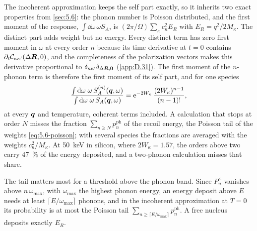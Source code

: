 The incoherent approximation keeps the self part exactly, so it inherits two exact properties from \cref{sec:5.6}: the phonon number is Poisson distributed, and the first moment of the response, $\int\dd\omega\,\omega S_A$, is $(2\pi/\Omega)\sum_\kappa c_\kappa^2E_R$ with $E_R = q^2/2M_\kappa$. The distinct part adds weight but no energy. Every distinct term has zero first moment in $\omega$ at every order $n$ because its time derivative at $t = 0$ contains $\partial_t\mathcal{C}_{\kappa\kappa'}(\Delta\bm{R},0)$, and the completeness of the polarization vectors makes this derivative proportional to $\delta_{\kappa\kappa'}\delta_{\Delta\bm{R},\bm{0}}$ (\cref{app:D.31}). The first moment of the $n$-phonon term is therefore the first moment of its self part, and for one species
\begin{equation}
  \frac{\int\mathrm{d}\omega\;\omega\,S^{(n)}_A(\bm{q},\omega)}{\int\mathrm{d}\omega\;\omega\,S_A(\bm{q},\omega)} = \mathrm{e}^{-2W_\kappa}\,\frac{(2W_\kappa)^{n-1}}{(n-1)!} ,
  \label{eq:11.3-fsum}
\end{equation}
at every $\bm{q}$ and temperature, coherent terms included. A calculation that stops at order $N$ misses the fraction $\sum_{n \ge N}p^{\mathrm{ph}}_n$ of the recoil energy, the Poisson tail of the weights \cref{eq:5.6-poisson}; with several species the fractions are averaged with the weights $c_\kappa^2/M_\kappa$. At \SI{50}{keV} in silicon, where $2W_\kappa = 1.57$, the orders above two carry \SI{47}{\percent} of the energy deposited, and a two-phonon calculation misses that share.

The tail matters most for a threshold above the phonon band. Since $P^\kappa_n$ vanishes above $n\,\omega_{\mathrm{max}}$, with $\omega_{\mathrm{max}}$ the highest phonon energy, an energy deposit above $E$ needs at least $\lceil E/\omega_{\mathrm{max}}\rceil$ phonons, and in the incoherent approximation at $T = 0$ its probability is at most the Poisson tail $\sum_{n \ge \lceil E/\omega_{\mathrm{max}}\rceil}p^{\mathrm{ph}}_n$. A free nucleus deposits exactly $E_R$.

